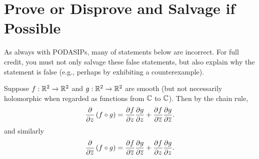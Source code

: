 \documentclass{homework}
\begin{document}
                                                                             \section{Prove or Disprove and Salvage if Possible}
                                                                             As always with PODASIPs, many of statements below are incorrect.  For
                                                                             full credit, you must not only salvage these false statements, but
                                                                             also explain why the statement is false (e.g., perhaps by exhibiting a
                                                                             counterexample).

                                                                             \begin{problem}
                                                                               Suppose $f : \mathbb{R}^2 \to \mathbb{R}^2$ and $g : \mathbb{R}^2 \to \mathbb{R}^2$ are smooth (but
                                                                                 not necessarily holomorphic when regarded as functions from $\mathbb{C}$ to
                                                                                   $\mathbb{C}$).  Then by the chain rule,
                                                                                     \[
                                                                                         \frac{\partial}{\partial z} \left( f \circ g \right) =
                                                                                             \frac{\partial f}{\partial z} \frac{\partial g}{\partial z} + \frac{\partial f}{\partial \overline{z}} \frac{\partial g}{\partial \overline{z}}.
                                                                                               \]
                                                                                                 and similarly
                                                                                                   \[
                                                                                                       \frac{\partial}{\partial \overline{z}} \left( f \circ g \right) =
                                                                                                           \frac{\partial f}{\partial \overline{z}} \frac{\partial g}{\partial \overline{z}} + \frac{\partial f}{\partial z} \frac{\partial g}{\partial z}.
                                                                                                             \]
                                                                                                             \end{problem}
\end{document}
